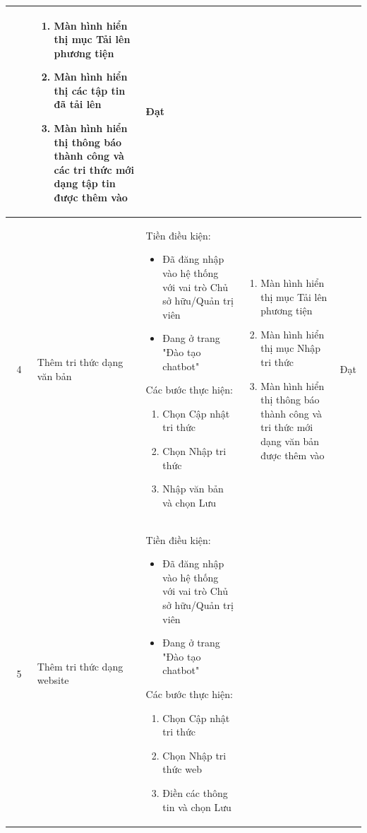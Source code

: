 \begin{longtable}{|c|m{2.5cm}|m{5.5cm}|m{4.5cm}|c|}
\begin{enumerate}[label=\arabic*.]
    \end{enumerate}
    & 
    \begin{enumerate}[label=\arabic*.]
        \item Màn hình hiển thị mục Tải lên phương tiện
        \item Màn hình hiển thị các tập tin đã tải lên
        \item Màn hình hiển thị thông báo thành công và các tri thức mới dạng tập tin được thêm vào 
    \end{enumerate} & Đạt \\
    \hline
    4 & 
    Thêm tri thức dạng văn bản & 
    Tiền điều kiện:
    \begin{itemize}
        \item Đã đăng nhập vào hệ thống với vai trò Chủ sở hữu/Quản trị viên
        \item Đang ở trang "Đào tạo chatbot"
    \end{itemize}
    Các bước thực hiện: 
    \begin{enumerate}[label=\arabic*.]
        \item Chọn Cập nhật tri thức
        \item Chọn Nhập tri thức
        \item Nhập văn bản và chọn Lưu
    \end{enumerate}
    & 
    \begin{enumerate}[label=\arabic*.]
        \item Màn hình hiển thị mục Tải lên phương tiện
        \item Màn hình hiển thị mục Nhập tri thức
        \item Màn hình hiển thị thông báo thành công và tri thức mới dạng văn bản được thêm vào 
    \end{enumerate}  & Đạt \\
    \hline
    5 & 
    Thêm tri thức dạng website & 
    Tiền điều kiện:
    \begin{itemize}
        \item Đã đăng nhập vào hệ thống với vai trò Chủ sở hữu/Quản trị viên
        \item Đang ở trang "Đào tạo chatbot"
    \end{itemize}
    Các bước thực hiện: 
    \begin{enumerate}[label=\arabic*.]
        \item Chọn Cập nhật tri thức
        \item Chọn Nhập tri thức web
        \item Điền các thông tin và chọn Lưu

\end{enumerate}
\end{longtable}
